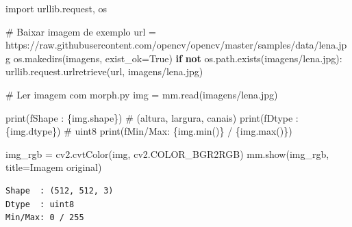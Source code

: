 \documentclass[
  portuguese,
  letterpaper,
  openany,
  oneside,
  12pt,
  a4paper]{book}
\newenvironment{Shaded}{\begin{snugshade}}{\end{snugshade}}
\newcommand{\BuiltInTok}[1]{\textcolor[rgb]{0.00,0.23,0.31}{#1}}
\newcommand{\CommentTok}[1]{\textcolor[rgb]{0.37,0.37,0.37}{#1}}
\newcommand{\ControlFlowTok}[1]{\textcolor[rgb]{0.00,0.23,0.31}{\textbf{#1}}}
\newcommand{\ImportTok}[1]{\textcolor[rgb]{0.00,0.46,0.62}{#1}}
\newcommand{\KeywordTok}[1]{\textcolor[rgb]{0.00,0.23,0.31}{\textbf{#1}}}
\newcommand{\NormalTok}[1]{\textcolor[rgb]{0.00,0.23,0.31}{#1}}
\newcommand{\OperatorTok}[1]{\textcolor[rgb]{0.37,0.37,0.37}{#1}}
\newcommand{\SpecialCharTok}[1]{\textcolor[rgb]{0.37,0.37,0.37}{#1}}
\newcommand{\SpecialStringTok}[1]{\textcolor[rgb]{0.13,0.47,0.30}{#1}}
\newcommand{\StringTok}[1]{\textcolor[rgb]{0.13,0.47,0.30}{#1}}
\newcommand{\VariableTok}[1]{\textcolor[rgb]{0.07,0.07,0.07}{#1}}
\begin{document}
\begin{tcolorbox}
\begin{Shaded}
\begin{Highlighting}[]
\ImportTok{import}\NormalTok{ urllib.request, os}

\CommentTok{\# Baixar imagem de exemplo}
\NormalTok{url }\OperatorTok{=} \StringTok{\textquotesingle{}https://raw.githubusercontent.com/opencv/opencv/master/samples/data/lena.jpg\textquotesingle{}}
\NormalTok{os.makedirs(}\StringTok{\textquotesingle{}imagens\textquotesingle{}}\NormalTok{, exist\_ok}\OperatorTok{=}\VariableTok{True}\NormalTok{)}
\ControlFlowTok{if} \KeywordTok{not}\NormalTok{ os.path.exists(}\StringTok{\textquotesingle{}imagens/lena.jpg\textquotesingle{}}\NormalTok{):}
\NormalTok{    urllib.request.urlretrieve(url, }\StringTok{\textquotesingle{}imagens/lena.jpg\textquotesingle{}}\NormalTok{)}

\CommentTok{\# Ler imagem com morph.py}
\NormalTok{img }\OperatorTok{=}\NormalTok{ mm.read(}\StringTok{\textquotesingle{}imagens/lena.jpg\textquotesingle{}}\NormalTok{)}

\BuiltInTok{print}\NormalTok{(}\SpecialStringTok{f\textquotesingle{}Shape  : }\SpecialCharTok{\{}\NormalTok{img}\SpecialCharTok{.}\NormalTok{shape}\SpecialCharTok{\}}\SpecialStringTok{\textquotesingle{}}\NormalTok{)    }\CommentTok{\# (altura, largura, canais)}
\BuiltInTok{print}\NormalTok{(}\SpecialStringTok{f\textquotesingle{}Dtype  : }\SpecialCharTok{\{}\NormalTok{img}\SpecialCharTok{.}\NormalTok{dtype}\SpecialCharTok{\}}\SpecialStringTok{\textquotesingle{}}\NormalTok{)    }\CommentTok{\# uint8}
\BuiltInTok{print}\NormalTok{(}\SpecialStringTok{f\textquotesingle{}Min/Max: }\SpecialCharTok{\{}\NormalTok{img}\SpecialCharTok{.}\BuiltInTok{min}\NormalTok{()}\SpecialCharTok{\}}\SpecialStringTok{ / }\SpecialCharTok{\{}\NormalTok{img}\SpecialCharTok{.}\BuiltInTok{max}\NormalTok{()}\SpecialCharTok{\}}\SpecialStringTok{\textquotesingle{}}\NormalTok{)}

\NormalTok{img\_rgb }\OperatorTok{=}\NormalTok{ cv2.cvtColor(img, cv2.COLOR\_BGR2RGB)}
\NormalTok{mm.show(img\_rgb, title}\OperatorTok{=}\StringTok{\textquotesingle{}Imagem original\textquotesingle{}}\NormalTok{)}
\end{Highlighting}
\end{Shaded}

\begin{verbatim}
Shape  : (512, 512, 3)
Dtype  : uint8
Min/Max: 0 / 255
\end{verbatim}

\begin{figure}[H]


\end{figure}
\end{tcolorbox}
\end{document}
